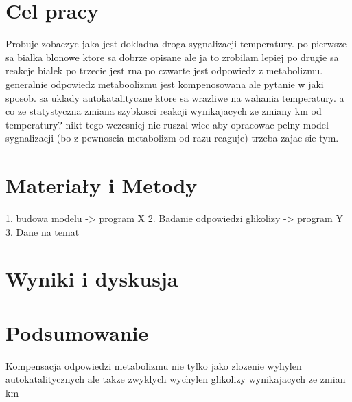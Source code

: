\documentclass{pracamgr}
\begin{document}
\chapter{Cel pracy}

Probuje zobaczyc jaka jest dokladna droga sygnalizacji temperatury. po pierwsze sa bialka blonowe ktore sa dobrze opisane ale ja to zrobilam lepiej
po drugie sa reakcje bialek po trzecie jest rna po czwarte jest odpowiedz z metabolizmu. generalnie odpowiedz metaboolizmu jest kompenosowana ale pytanie w jaki sposob.
sa uklady autokatalityczne ktore sa wrazliwe na wahania temperatury. a co ze statystyczna zmiana szybkosci reakcji wynikajacych ze zmiany km od temperatury?
nikt tego wczesniej nie ruszal wiec aby opracowac pelny model sygnalizacji (bo z pewnoscia metabolizm od razu reaguje) trzeba zajac sie tym.

\chapter{Materiały i Metody}

1. budowa modelu
-> program X 
2. Badanie odpowiedzi glikolizy
-> program Y
3. Dane na temat 

\chapter{Wyniki i dyskusja}

\chapter{Podsumowanie}

Kompensacja odpowiedzi metabolizmu nie tylko jako zlozenie wyhylen autokatalitycznych ale takze zwyklych wychylen glikolizy wynikajacych ze zmian km




\end{document}

